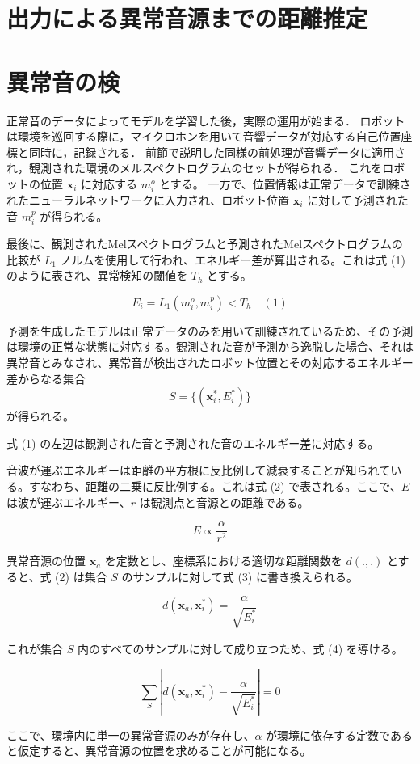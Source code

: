 \documentclass[../main]{subfiles}
\begin{document}
\section{出力による異常音源までの距離推定}
\label{sec:pmethod_anomaly_detection}

\section{異常音の検}
正常音のデータによってモデルを学習した後，実際の運用が始まる．
ロボットは環境を巡回する際に，マイクロホンを用いて音響データが対応する自己位置座標と同時に，記録される．
前節で説明した同様の前処理が音響データに適用され，観測された環境のメルスペクトログラムのセットが得られる．
これをロボットの位置 $\mathbf{x}_i$ に対応する $m_i^o$ とする。
一方で、位置情報は正常データで訓練されたニューラルネットワークに入力され、ロボット位置 $\mathbf{x}_i$ に対して予測された音 $m_i^p$ が得られる。

最後に、観測されたMelスペクトログラムと予測されたMelスペクトログラムの比較が $L_1$ ノルムを使用して行われ、エネルギー差が算出される。これは式 (1) のように表され、異常検知の閾値を $T_h$ とする。

\begin{equation}
    E_i = L_1(m_i^o, m_i^p) < T_h \quad (1)
\end{equation}

予測を生成したモデルは正常データのみを用いて訓練されているため、その予測は環境の正常な状態に対応する。観測された音が予測から逸脱した場合、それは異常音とみなされ、異常音が検出されたロボット位置とその対応するエネルギー差からなる集合
\[
S = \{ (\mathbf{x}_i^*, E_i^*) \}
\]
が得られる。

\label{sec:pmethod_preprocessing}


式 (1) の左辺は観測された音と予測された音のエネルギー差に対応する。

音波が運ぶエネルギーは距離の平方根に反比例して減衰することが知られている。すなわち、距離の二乗に反比例する。これは式 (2) で表される。ここで、$E$ は波が運ぶエネルギー、$r$ は観測点と音源との距離である。

\begin{equation}
    E \propto \frac{\alpha}{r^2} \tag{2}
\end{equation}

異常音源の位置 $\mathbf{x}_a$ を定数とし、座標系における適切な距離関数を $d(., .)$ とすると、式 (2) は集合 $S$ のサンプルに対して式 (3) に書き換えられる。

\begin{equation}
    d(\mathbf{x}_a, \mathbf{x}_i^*) = \frac{\alpha}{\sqrt{E_i^*}} \tag{3}
\end{equation}

これが集合 $S$ 内のすべてのサンプルに対して成り立つため、式 (4) を導ける。

\begin{equation}
    \sum_{S} \left| d(\mathbf{x}_a, \mathbf{x}_i^*) - \frac{\alpha}{\sqrt{E_i^*}} \right| = 0 \tag{4}
\end{equation}

ここで、環境内に単一の異常音源のみが存在し、$\alpha$ が環境に依存する定数であると仮定すると、異常音源の位置を求めることが可能になる。
\end{document}
